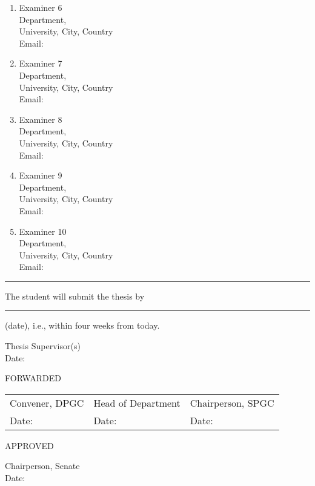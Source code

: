 \documentclass[11pt]{article}
\begin{document}
\begin{enumerate}
    \item Examiner 6\\
        Department,\\
        University, City, Country\\
        Email:
    \item Examiner 7\\
        Department,\\
        University, City, Country\\
        Email:
    \item Examiner 8\\
        Department,\\
        University, City, Country\\
        Email:
    \item Examiner 9\\
        Department,\\
        University, City, Country\\
        Email:
    \item Examiner 10\\
        Department,\\
        University, City, Country\\
        Email:

\end{enumerate}


\hrule
\vspace{2em}

The student will submit the thesis by \rule{7em}{0.5pt} (date), i.e., within four weeks from today.

\bf
\vspace{3em}

\begin{flushright}
    Thesis Supervisor(s)\\
    Date:
\end{flushright}

\centering
FORWARDED
\vspace{4em}

\begin{table*}[!ht]

	\bf
	\setlength{\tabcolsep}{2.5em}
    \begin{tabular}{l l l}
		\hspace{-4em}
        Convener, DPGC & Head of Department & Chairperson, SPGC\\
		\hspace{-4em}
		Date:   & Date:     & Date:     \\
    \end{tabular}
\end{table*}

\vspace{3em}
APPROVED
\vspace{5em}

Chairperson, Senate\\
\hspace{-7em} Date:
\end{document}
